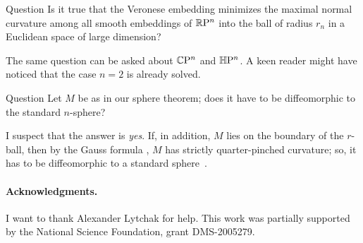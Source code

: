 \documentclass[a4paper,10pt]{article}
\begin{document}
\begin{thm}{Question}
Is it true that the Veronese embedding minimizes the maximal normal curvature among all smooth embeddings of $\mathbb{R}\mathrm{P}^n$ into the ball of radius $r_n$ in a Euclidean space of large dimension?
\end{thm}

The same question can be asked about $\mathbb{C}\mathrm{P}^n$ and $\mathbb{H}\mathrm{P}^n$. 
A keen reader might have noticed that the case $n=2$ is already solved.

\begin{thm}{Question}
Let $M$ be as in our sphere theorem;
does it have to be diffeomorphic to the standard $n$-sphere?
\end{thm}

I suspect that the answer is \textit{yes}.
If, in addition, $M$ lies on the boundary of the $r$-ball, then by the Gauss formula \cite[Lemma 5]{petrunin2024}, $M$  has strictly quarter-pinched curvature;
so, it has to be diffeomorphic to a standard sphere~\cite{brendle-schoen}.

\paragraph{Acknowledgments.}
I want to thank Alexander Lytchak for help.
This work was partially supported by the National Science Foundation, grant DMS-2005279.

{\sloppy
\def\emph{\textit}
\printbibliography[heading=bibintoc]
\fussy
}
\end{document}
